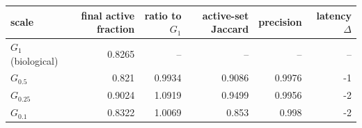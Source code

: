 {\small\setlength{\tabcolsep}{3pt}
\begin{tabular}{l r r r r r}
\toprule
scale & final active fraction & ratio to $G_1$ & active-set Jaccard & precision & latency $\Delta$ \\
\midrule
$G_1$ (biological) & 0.8265 & -- & -- & -- & -- \\
$G_{0.5}$ & 0.821 & 0.9934 & 0.9086 & 0.9976 & -1 \\
$G_{0.25}$ & 0.9024 & 1.0919 & 0.9499 & 0.9956 & -2 \\
$G_{0.1}$ & 0.8322 & 1.0069 & 0.853 & 0.998 & -2 \\
\bottomrule
\end{tabular}

}

